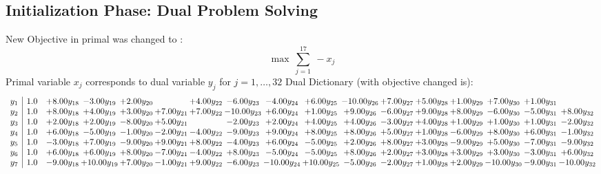 \documentclass[9pt]{article}
\begin{document}
\subsection{Initialization Phase: Dual Problem Solving}
New Objective in primal was changed to : \[ \max\ \sum_{j=1}^{17}\ - x_j \] 
Primal variable $x_j$ corresponds to dual variable $y_j$ for $j = 1,\ldots,32$
Dual Dictionary (with objective changed is): 
\[\begin{array}{c| c c@{\hskip 2pt} c@{\hskip 2pt} c@{\hskip 2pt} c@{\hskip 2pt} c@{\hskip 2pt} c@{\hskip 2pt} c@{\hskip 2pt} c@{\hskip 2pt} c@{\hskip 2pt} c@{\hskip 2pt} c@{\hskip 2pt} c@{\hskip 2pt} c@{\hskip 2pt} c@{\hskip 2pt} c@{\hskip 2pt} }
 y_{1}   &  1.0 & +  8.00 y_{18} & -3.00 y_{19} & +  2.00 y_{20} &   & +  4.00 y_{22} & -6.00 y_{23} & -4.00 y_{24} & +  6.00 y_{25} & -10.00 y_{26} & +  7.00 y_{27} & +  5.00 y_{28} & +  1.00 y_{29} & +  7.00 y_{30} & +  1.00 y_{31} &   \\
 y_{2}   &  1.0 & +  8.00 y_{18} & +  4.00 y_{19} & +  3.00 y_{20} & +  7.00 y_{21} & +  7.00 y_{22} & -10.00 y_{23} & +  6.00 y_{24} & +  1.00 y_{25} & +  9.00 y_{26} & -6.00 y_{27} & +  9.00 y_{28} & +  8.00 y_{29} & -6.00 y_{30} & -5.00 y_{31} & +  8.00 y_{32}\\
 y_{3}   &  1.0 & +  2.00 y_{18} & +  2.00 y_{19} & -8.00 y_{20} & +  5.00 y_{21} &   & -2.00 y_{23} & +  2.00 y_{24} & +  4.00 y_{25} & +  4.00 y_{26} & -3.00 y_{27} & +  4.00 y_{28} & +  1.00 y_{29} & +  1.00 y_{30} & +  1.00 y_{31} & -2.00 y_{32}\\
 y_{4}   &  1.0 & +  6.00 y_{18} & -5.00 y_{19} & -1.00 y_{20} & -2.00 y_{21} & -4.00 y_{22} & -9.00 y_{23} & +  9.00 y_{24} & +  8.00 y_{25} & +  8.00 y_{26} & +  5.00 y_{27} & +  1.00 y_{28} & -6.00 y_{29} & +  8.00 y_{30} & +  6.00 y_{31} & -1.00 y_{32}\\
 y_{5}   &  1.0 & -3.00 y_{18} & +  7.00 y_{19} & -9.00 y_{20} & +  9.00 y_{21} & +  8.00 y_{22} & -4.00 y_{23} & +  6.00 y_{24} & -5.00 y_{25} & +  2.00 y_{26} & +  8.00 y_{27} & +  3.00 y_{28} & -9.00 y_{29} & +  5.00 y_{30} & -7.00 y_{31} & -9.00 y_{32}\\
 y_{6}   &  1.0 & +  6.00 y_{18} & +  6.00 y_{19} & +  8.00 y_{20} & -7.00 y_{21} & -4.00 y_{22} & +  8.00 y_{23} & -5.00 y_{24} & -5.00 y_{25} & +  8.00 y_{26} & +  2.00 y_{27} & +  3.00 y_{28} & +  3.00 y_{29} & +  3.00 y_{30} & -3.00 y_{31} & +  6.00 y_{32}\\
 y_{7}   &  1.0 & -9.00 y_{18} & + 10.00 y_{19} & +  7.00 y_{20} & -1.00 y_{21} & +  9.00 y_{22} & -6.00 y_{23} & -10.00 y_{24} & + 10.00 y_{25} & -5.00 y_{26} & -2.00 y_{27} & +  1.00 y_{28} & +  2.00 y_{29} & -10.00 y_{30} & -9.00 y_{31} & -10.00 y_{32}\\

\end{array}\]
\end{document}

